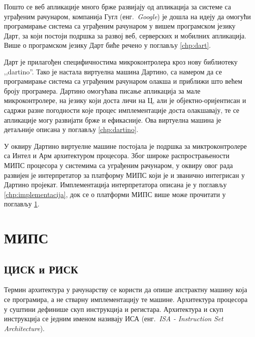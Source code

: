 \documentclass[12pt,oneside]{memoir}
\begin{document}
Пошто се веб апликације много брже развијају од апликација за системе са уграђеним рачунаром, компанија Гугл (енг.~\textit{Google}) је дошла на идеју да омогући програмирање система са уграђеним рачунаром у вишем програмском језику Дарт, за који постоји подршка за развој веб, серверских и мобилних апликација. Више о програмском језику Дарт биће речено у поглављу \ref{chp:dart}.

Дарт је прилагођен специфичностима микроконтролера кроз нову библиотеку ,,dartino''. Тако је настала виртуелна машина Дартино, са намером да се програмирање система са уграђеним рачунаром олакша и приближи што већем броју програмера. Дартино омогућава писање апликација за мале микроконтролере, на језику који доста личи на Ц, али је објектно-оријентисан и садржи разне погодности које процес имплементације доста олакшавају, те се апликације могу развијати брже и ефикасније. Ова виртуелна машина је детаљније описана у поглављу \ref{chp:dartino}.

У оквиру Дартино виртуелне машине постојала је подршка за миктроконтролере са Интел и Арм архитектуром процесора. Због широке распрострањености МИПС процесора у системима са уграђеним рачунаром, у оквиру овог рада развијен је интерпретатор за платформу МИПС који је и званично интегрисан у Дартино пројекат. Имплементација интерпретатора описана је у поглављу \ref{chp:implementacija}, док се о платформи МИПС више може прочитати у поглављу \ref{chp:mips}.\\




\chapter{МИПС}
\label{chp:mips}

\section{ЦИСК и РИСК}
Термин архитектура у рачунарству се користи да опише апстрактну машину која се програмира, а не стварну имплементацију те машине. Архитектура процесора у суштини дефинише скуп инструкција и регистара. Архитектура и скуп инструкција се једним именом називају ИСА (енг.~\textit{ISA - Instruction Set Architecture})\cite{isa}.
\end{document}
